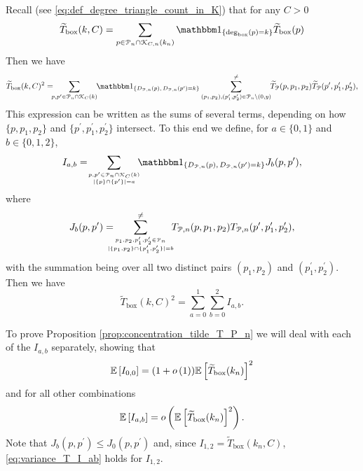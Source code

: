 Recall (see \eqref{eq:def_degree_triangle_count_in_K}) that for any $C > 0$
\[
	\widetilde{T}_{\text{box}}(k,C) = \sum_{p \in \Pcal_n \cap \Kcal_{C,n}(k_n)} \ind{\text{deg}_{\text{box}}(p) = k} \widetilde{T}_{\text{box}}(p)
\]
Then we have
\[
	\widetilde{T}_{\text{box}}(k,C)^2 = \hspace{-5pt} \sum_{p, p^\prime \in \Pcal_n \cap \Kcal_C(k)}
		\hspace{-3pt} \ind{D_{\Pcal,n}(p), \, D_{\Pcal,n}(p^\prime) = k} 
		\sum_{(p_1, p_2), (p_1^\prime, p_2^\prime) \in \Pcal_n \setminus (0,y)}^{\ne} \hspace{-3pt}
		\widetilde{T}_{\Pcal}(p,p_1,p_2) \widetilde{T}_{\Pcal}(p^\prime, p_1^\prime, p_2^\prime),
\]
This expression can be written as the sums of several terms, depending on how $\{p, p_1, p_2\}$ and $\{p^\prime, p_1^\prime, p_2^\prime\}$ intersect. To this end we define, for $a \in \{0,1\}$ and $b \in \{0,1,2\}$,
\[
	I_{a,b} = \hspace{-3pt} \sum_{p, p^\prime \in \Pcal_n \cap \Kcal_C(k) \atop |\{p\} \cap \{p^\prime\}| = a}
	\hspace{-5pt} \ind{D_{\Pcal,n}(p), \, D_{\Pcal,n}(p^\prime) = k} J_b(p,p^\prime),
\]
where
\[
	J_b(p,p^\prime) = \hspace{-10pt} \sum_{p_1, p_2, p_1^\prime, p_2^\prime \in \Pcal_n 
		\atop |\{p_1, p_2\} \cap \{p_1^\prime, p_2^\prime\}| = b}^{\ne}
		\hspace{-5pt} T_{\Pcal,n}(p,p_1,p_2) T_{\Pcal,n}(p^\prime, p_1^\prime, p_2^\prime),
\]
with the summation being over all two distinct pairs $(p_1, p_2)$ and $(p_1^\prime, p_2^\prime)$. Then we have
\[
	\widetilde{T}_{\text{box}}(k, C)^2 = \sum_{a = 0}^1 \sum_{b = 0}^2 I_{a,b}.
\]

To prove Proposition \ref{prop:concentration_tilde_T_P_n} we will deal with each of the $I_{a,b}$ separately, showing that 
\begin{equation}\label{eq:variance_T_I_00}
	\mathbb{E}\left[I_{0,0}\right] = (1+o\left(1\right))\mathbb{E}\left[\widetilde{T}_{\text{box}}(k_n)\right]^2
\end{equation}
and for all other combinations
\begin{equation}\label{eq:variance_T_I_ab}
	\mathbb{E}\left[I_{a,b}\right] = o\left(\mathbb{E}\left[\widetilde{T}_{\text{box}}(k_n)\right]^2\right).
\end{equation}
Note that $J_{b}(p,p^\prime) \le J_{0}(p,p^\prime)$ and, since $I_{1,2} = \widetilde{T}_{\text{box}}(k_n,C)$, \eqref{eq:variance_T_I_ab} holds for $I_{1,2}$. 

